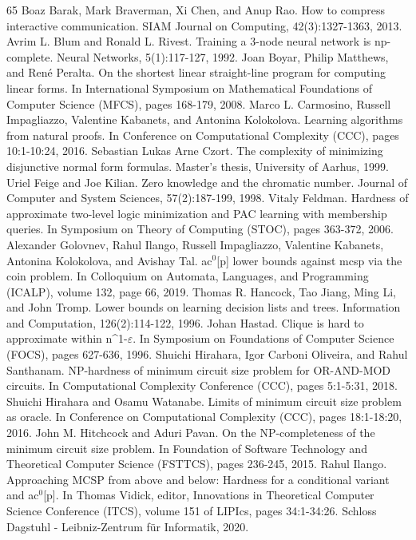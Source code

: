 \begin{thebibliography}{65}
 Boaz Barak, Mark Braverman, Xi Chen, and Anup Rao. How to compress interactive communication. SIAM Journal on Computing, 42(3):1327-1363, 2013.
 Avrim L. Blum and Ronald L. Rivest. Training a 3-node neural network is np-complete. Neural Networks, 5(1):117-127, 1992.
 Joan Boyar, Philip Matthews, and René Peralta. On the shortest linear straight-line program for computing linear forms. In International Symposium on Mathematical Foundations of Computer Science (MFCS), pages 168-179, 2008.
 Marco L. Carmosino, Russell Impagliazzo, Valentine Kabanets, and Antonina Kolokolova. Learning algorithms from natural proofs. In Conference on Computational Complexity (CCC), pages 10:1-10:24, 2016.
 Sebastian Lukas Arne Czort. The complexity of minimizing disjunctive normal form formulas. Master’s thesis, University of Aarhus, 1999.
 Uriel Feige and Joe Kilian. Zero knowledge and the chromatic number. Journal of Computer and System Sciences, 57(2):187-199, 1998.
 Vitaly Feldman. Hardness of approximate two-level logic minimization and PAC learning with membership queries. In Symposium on Theory of Computing (STOC), pages 363-372, 2006.
 Alexander Golovnev, Rahul Ilango, Russell Impagliazzo, Valentine Kabanets, Antonina Kolokolova, and Avishay Tal. ac$^0$[p] lower bounds against mcsp via the coin problem. In Colloquium on Automata, Languages, and Programming (ICALP), volume 132, page 66, 2019.
 Thomas R. Hancock, Tao Jiang, Ming Li, and John Tromp. Lower bounds on learning decision lists and trees. Information and Computation, 126(2):114-122, 1996.
 Johan Hastad. Clique is hard to approximate within n\textasciicircum{}1-$\varepsilon$. In Symposium on Foundations of Computer Science (FOCS), pages 627-636, 1996.
 Shuichi Hirahara, Igor Carboni Oliveira, and Rahul Santhanam. NP-hardness of minimum circuit size problem for OR-AND-MOD circuits. In Computational Complexity Conference (CCC), pages 5:1-5:31, 2018.
 Shuichi Hirahara and Osamu Watanabe. Limits of minimum circuit size problem as oracle. In Conference on Computational Complexity (CCC), pages 18:1-18:20, 2016.
 John M. Hitchcock and Aduri Pavan. On the NP-completeness of the minimum circuit size problem. In Foundation of Software Technology and Theoretical Computer Science (FSTTCS), pages 236-245, 2015.
 Rahul Ilango. Approaching MCSP from above and below: Hardness for a conditional variant and ac$^0$[p]. In Thomas Vidick, editor, Innovations in Theoretical Computer Science Conference (ITCS), volume 151 of LIPIcs, pages 34:1-34:26. Schloss Dagstuhl - Leibniz-Zentrum für Informatik, 2020.

\end{thebibliography}
